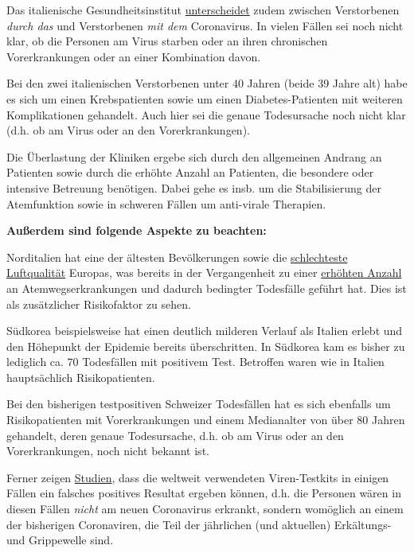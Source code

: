 Das italienische Gesundheitsinstitut
\href{https://youtu.be/0M4kbPDHGR0?t=210}{unterscheidet} zudem zwischen
Verstorbenen \emph{durch das} und Verstorbenen \emph{mit dem}
Coronavirus. In vielen Fällen sei noch nicht klar, ob die Personen am
Virus starben oder an ihren chronischen Vorerkrankungen oder an einer
Kombination davon.

Bei den zwei italienischen Verstorbenen unter 40 Jahren (beide 39 Jahre
alt) habe es sich um einen Krebspatienten sowie um einen
Diabetes-Patienten mit weiteren Komplikationen gehandelt. Auch hier sei
die genaue Todesursache noch nicht klar (d.h. ob am Virus oder an den
Vorerkrankungen).

Die Überlastung der Kliniken ergebe sich durch den allgemeinen Andrang
an Patienten sowie durch die erhöhte Anzahl an Patienten, die besondere
oder intensive Betreuung benötigen. Dabei gehe es insb. um die
Stabilisierung der Atemfunktion sowie in schweren Fällen um anti-virale
Therapien.

\textbf{Außerdem sind folgende Aspekte zu beachten:}

Norditalien hat eine der ältesten Bevölkerungen sowie die
\href{https://twitter.com/esa/status/1238480433047916545}{schlechteste
Luftqualität} Europas, was bereits in der Vergangenheit zu einer
\href{https://www.srf.ch/news/international/massive-schadstoffbelastung-nirgendwo-erkranken-so-viele-wegen-smog-wie-in-norditalien}{erhöhten
Anzahl} an Atemwegserkrankungen und dadurch bedingter Todesfälle geführt
hat. Dies ist als zusätzlicher Risikofaktor zu sehen.

Südkorea beispielsweise hat einen deutlich milderen Verlauf als Italien
erlebt und den Höhepunkt der Epidemie bereits überschritten. In Südkorea
kam es bisher zu lediglich ca. 70 Todesfällen mit positivem Test.
Betroffen waren wie in Italien hauptsächlich Risikopatienten.

Bei den bisherigen testpositiven Schweizer Todesfällen hat es sich
ebenfalls um Risiko­patienten mit Vorerkrankungen und einem Medianalter
von über 80 Jahren gehandelt, deren genaue Todesursache, d.h. ob am
Virus oder an den Vorerkrankungen, noch nicht bekannt ist.

Ferner zeigen
\href{https://www.ncbi.nlm.nih.gov/pmc/articles/PMC2095096/}{Studien},
dass die weltweit verwendeten Viren-Testkits in einigen Fällen ein
falsches positives Resultat ergeben können, d.h. die Personen wären in
diesen Fällen \emph{nicht} am neuen Coronavirus erkrankt, sondern
womöglich an einem der bisherigen Coronaviren, die Teil der jährlichen
(und aktuellen) Erkältungs- und Grippewelle sind.

